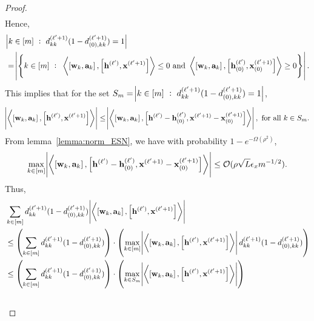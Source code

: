 \begin{proof}
\begin{align*}
	\end{align*}
	Hence,
	\begin{align*}
		&\abs{k \in [m] \text{ } : \text{ } d^{(\ell'+1)}_{kk} (1 - d^{(\ell'+1)}_{(0), kk}) = 1} \\&= \abs{\left\{k \in [m] \text{ } : \text{ } \left\langle \left[\mathbf{w}_k, \mathbf{a}_k\right],  \left[\mathbf{h}^{(\ell')}, \mathbf{x}^{(\ell'+1)}\right] \right\rangle \le 0 \text{ and }  \left\langle \left[\mathbf{w}_k, \mathbf{a}_k\right],  \left[\mathbf{h}_{(0)}^{(\ell')}, \mathbf{x}^{(\ell'+1)}_{(0)}\right] \right\rangle \ge 0 \right\}}.
	\end{align*}
	This implies that for the set $S_{m}= \abs{k \in [m] \text{ } : \text{ } d^{(\ell'+1)}_{kk} (1 - d^{(\ell'+1)}_{(0), kk}) = 1}$,
	\begin{align*}
		\abs{\left\langle \left[\mathbf{w}_k, \mathbf{a}_k\right],  \left[\mathbf{h}^{(\ell')}, \mathbf{x}^{(\ell'+1)}\right] \right\rangle} \le \abs{\left\langle \left[\mathbf{w}_k, \mathbf{a}_k\right],  \left[ \mathbf{h}^{(\ell')} - \mathbf{h}_{(0)}^{(\ell')}, \mathbf{x}^{(\ell'+1)} - \mathbf{x}^{(\ell'+1)}_{(0)}\right] \right\rangle}, \text{ for all } k \in S_m.
	\end{align*}
	From lemma~\ref{lemma:norm_ESN}, we have with probability $1-e^{-\Omega(\rho^2)}$,
	\begin{align*}
		\max_{k \in [m]} \abs{\left\langle \left[\mathbf{w}_k, \mathbf{a}_k\right],  \left[ \mathbf{h}^{(\ell')} - \mathbf{h}_{(0)}^{(\ell')}, \mathbf{x}^{(\ell'+1)} - \mathbf{x}^{(\ell'+1)}_{(0)}\right] \right\rangle} \le \mathcal{O}(\rho \sqrt{L} \epsilon_x m^{-1/2}).
	\end{align*}
	Thus, 
	\begin{align*}
		&\sum_{k \in [m]} d^{(\ell'+1)}_{kk} (1 - d^{(\ell'+1)}_{(0), kk}) \abs{\left\langle \left[\mathbf{w}_k, \mathbf{a}_k\right],  \left[\mathbf{h}^{(\ell')}, \mathbf{x}^{(\ell'+1)}\right] \right\rangle}  \\&
		\le \left(\sum_{k \in [m]} d^{(\ell'+1)}_{kk} (1 - d^{(\ell'+1)}_{(0), kk}) \right) \cdot  \left( \max_{k \in [m]} \abs{\left\langle \left[\mathbf{w}_k, \mathbf{a}_k\right],  \left[\mathbf{h}^{(\ell')}, \mathbf{x}^{(\ell'+1)}\right] \right\rangle} d^{(\ell'+1)}_{kk} (1 - d^{(\ell'+1)}_{(0), kk}) \right) \\&
		\le \left(\sum_{k \in [m]} d^{(\ell'+1)}_{kk} (1 - d^{(\ell'+1)}_{(0), kk}) \right) \cdot  \left( \max_{k \in S_m} \abs{\left\langle \left[\mathbf{w}_k, \mathbf{a}_k\right],  \left[\mathbf{h}^{(\ell')}, \mathbf{x}^{(\ell'+1)}\right] \right\rangle}  \right) \\&

\end{align*}
\end{proof}
